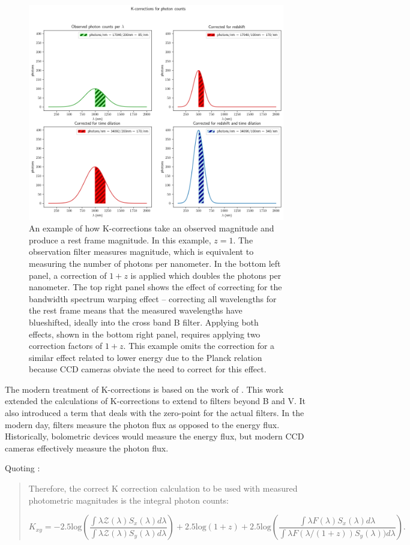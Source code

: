 \documentclass[linenumbers]{aastex631}
\begin{document}
\begin{figure}
  \includegraphics[width=.75\linewidth]{K-corrections_for_photon_counts.png}
  \caption{An example of how K-corrections take an observed magnitude and
  produce a rest frame magnitude. In this example, $z=1$. The observation
  filter measures magnitude, which is equivalent to measuring the number of
  photons per nanometer. In the bottom left panel, a correction of $1+z$ is
  applied which doubles the photons per nanometer. The top right panel shows
  the effect of correcting for the bandwidth spectrum warping effect --
  correcting all wavelengths for the rest frame means that the measured
  wavelengths have blueshifted, ideally into the cross band B filter. Applying
  both effects, shown in the bottom right panel, requires applying two
  correction factors of $1+z$. This example omits the correction for a similar
  effect related to lower energy due to the Planck relation because CCD cameras
  obviate the need to correct for this effect.
  }
  \label{fig:k-example}
\end{figure}

The modern treatment of K-corrections is based on the work of \citet{kim1996}.
This work extended the calculations of K-corrections to extend to filters
beyond B and V. It also introduced a term that deals with the zero-point for
the actual filters. In the modern day, filters measure the photon flux as
opposed to the energy flux. Historically, bolometric devices would measure the
energy flux, but modern CCD cameras effectively measure the photon flux.

Quoting \citet{kim1996}:

\begin{quote}
  Therefore, the correct K correction calculation to be used with measured
  photometric magnitudes is the integral photon counts:

  \begin{equation}
  \label{eq:kim}
    K_{xy} =
      -2.5\text{log} \left(
        \frac{\int \lambda \mathcal{Z}(\lambda)S_x(\lambda)d\lambda}
             {\int \lambda \mathcal{Z}(\lambda)S_y(\lambda)d\lambda}\right)
      + 2.5\text{log}(1+z)
      + 2.5\text{log}\left(
        \frac{\int \lambda F(\lambda)S_x(\lambda)d\lambda}
             {\int \lambda F(\lambda/(1+z))S_y(\lambda))d\lambda}\right).
  \end{equation}
\end{quote}
\end{document}
